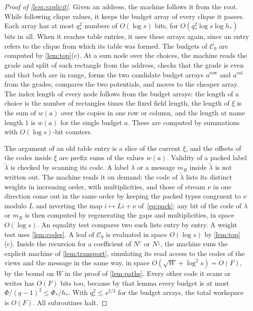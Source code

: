 \documentclass[11pt]{article}
\theoremstyle{definition}
\theoremstyle{definition}
\theoremstyle{remark}
\newcommand{\row}{\mathrm{row}}
\newcommand{\col}{\mathrm{col}}
\newcommand{\Nup}{N^{\uparrow}}
\newcommand{\Ndown}{N^{\downarrow}}
\begin{document}
\begin{proof}[Proof of \cref{lem:explicit}]
Given an address, the machine follows it from the root. While following clique values, it keeps the budget array of every clique it passes. Each array has at most $q_*^2$ numbers of $O(\log s)$ bits, for $O(q_*^2\log s\log h_*)$ bits in all. When it reaches table entries, it uses these arrays again, since an entry refers to the clique from which its table was formed. The budgets of $\mathcal C_0$ are computed by \cref{lem:top}(c). At a sum node over the choices, the machine reads the grade and split of each rectangle from the address, checks that the grade is even and that both are in range, forms the two candidate budget arrays $a^\row$ and $a^\col$ from the grades, compares the two potentials, and moves to the cheaper array. The index length of every node follows from the budget arrays: the length of a choice is the number of rectangles times the fixed field length, the length of $\xi$ is the sum of $w(a)$ over the copies in one row or column, and the length at name length $1$ is $w(a)$ for the single budget $a$. These are computed by summations with $O(\log s)$-bit counters.

The argument of an old table entry is a slice of the current $\xi$, and the offsets of the codes inside $\xi$ are prefix sums of the values $w(a)$. Validity of a packed label $\tilde\lambda$ is checked by scanning its code. A label $\lambda$ or a message $m_R$ inside $\tilde\lambda$ is not written out. The machine reads it on demand: the code of $\tilde\lambda$ lists its distinct weights in increasing order, with multiplicities, and those of stream $\nu$ in one direction come out in the same order by keeping the packed types congruent to $\nu$ modulo $L$ and inverting the map $i\mapsto Li+\nu$ of~\eqref{eq:pack}; any bit of the code of $\lambda$ or $m_R$ is then computed by regenerating the gaps and multiplicities, in space $O(\log s)$. An equality test compares two such lists entry by entry. A weight test uses \cref{lem:codes}. A leaf of $\mathcal C_0$ is evaluated in space $O(\log s)$ by \cref{lem:top}(c). Inside the recursion for a coefficient of $\Nup$ or $\Ndown$, the machine runs the explicit machine of \cref{lem:transport}, simulating its read access to the codes of the views and the message in the same way, in space $O(\sqrt W+\log^2s)=O(F)$, by the bound on $W$ in the proof of \cref{lem:paths}. Every other code it scans or writes has $O(F)$ bits too, because by that lemma every budget is at most $\Phi/(q-1)^2\le\Phi_*/h_*$. With $q_*^2\le s^{2/3}$ for the budget arrays, the total workspace is $O(F)$. All subroutines halt.
\end{proof}
\end{document}
